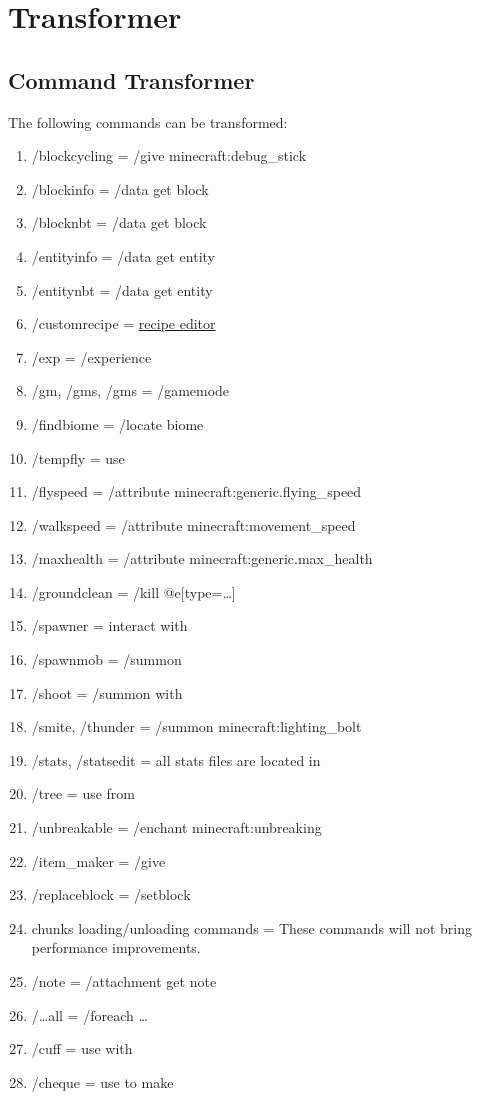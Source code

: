 \chapter{Transformer}\label{ch:transformer}
\section{Command Transformer}
The following commands can be transformed:
\begin{enumerate}
    \item /blockcycling = /give \player minecraft:debug\_stick
    \item /blockinfo = /data get block
    \item /blocknbt = /data get block
    \item /entityinfo = /data get entity
    \item /entitynbt = /data get entity
    \item /customrecipe = \href{https://crafting.thedestruc7i0n.ca/}{recipe editor}
    \item /exp = /experience
    \item /gm, /gms, /gms = /gamemode
    \item /findbiome = /locate biome
    \item /tempfly = use 
    \item /flyspeed = /attribute \player minecraft:generic.flying\_speed
    \item /walkspeed = /attribute \player minecraft:movement\_speed
    \item /maxhealth = /attribute \player minecraft:generic.max\_health
    \item /groundclean = /kill @e[type=\ldots]
    \item /spawner = interact  with 
    \item /spawnmob = /summon
    \item /shoot = /summon with 
    \item /smite, /thunder = /summon minecraft:lighting\_bolt
    \item /stats, /statsedit = all stats files are located in 
    \item /tree = use  from 
    \item /unbreakable = /enchant \player minecraft:unbreaking
    \item /item\_maker = /give
    \item /replaceblock = /setblock
    \item chunks loading/unloading commands = These commands will not bring performance improvements.
    \item /note = /attachment get note
    \item /\ldots all = /foreach \ldots
    \item /cuff = use  with 
    \item /cheque = use  to make 
\end{enumerate}

